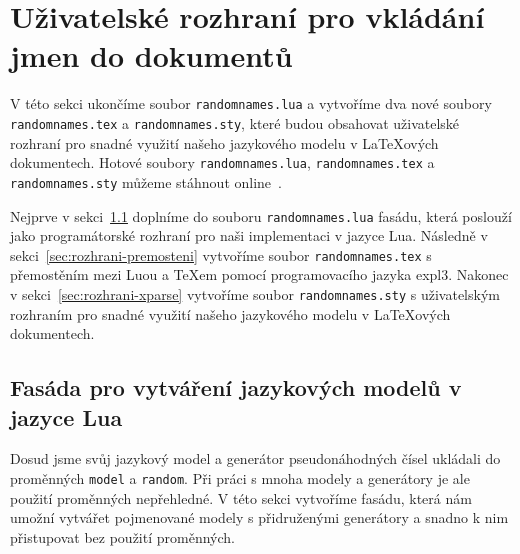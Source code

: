 \documentclass{csbulletin}
\let\exampleoutput\emph
\newcommand\vref[1]{\ref{#1} na straně~\pageref{#1}}
\let\vref=\ref
\begin{document}
\noindent
\exampleoutput{}

\section{Uživatelské rozhraní pro vkládání jmen do dokumentů}
\label{sec:rozhrani}

V této sekci ukončíme soubor \texttt{randomnames.lua} a vytvoříme dva nové soubory \texttt{randomnames.tex} a \texttt{randomnames.sty}, které budou obsahovat uživatelské rozhraní pro snadné využití našeho jazykového modelu v \LaTeX ových dokumentech. Hotové soubory \texttt{randomnames.lua}, \texttt{randomnames.tex} a \texttt{randomnames.sty} můžeme stáhnout online~\cite{novotny2023napadovnik}.

Nejprve v sekci~\ref{sec:rozhrani-fasada} doplníme do souboru \texttt{randomnames.lua} fasádu, která poslouží jako programátorské rozhraní pro naši implementaci v jazyce Lua. Následně v sekci~\vref{sec:rozhrani-premosteni} vytvoříme soubor \texttt{randomnames.tex} s přemostěním mezi Luou a \TeX em pomocí programovacího jazyka expl3. Nakonec v sekci~\vref{sec:rozhrani-xparse} vytvoříme soubor \texttt{randomnames.sty} s uživatelským rozhraním pro snadné využití našeho jazykového modelu v \LaTeX ových dokumentech.

\subsection{Fasáda pro vytváření jazykových modelů v jazyce Lua}
\label{sec:rozhrani-fasada}

Dosud jsme svůj jazykový model a generátor pseudonáhodných čísel ukládali do proměnných \texttt{model} a \texttt{random}. Při práci s mnoha modely a generátory je ale použití proměnných nepřehledné. V této sekci vytvoříme fasádu, která nám umožní vytvářet pojmenované modely s přidruženými generátory a snadno k nim přistupovat bez použití proměnných.
\end{document}
